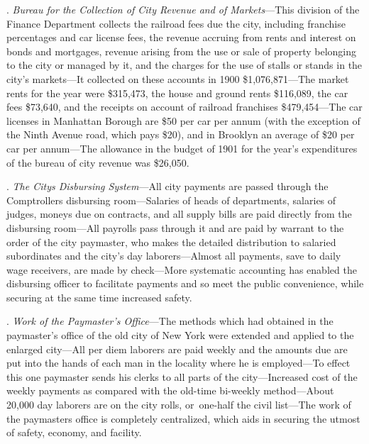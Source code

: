 \documentclass[twoside,symmetric,nobib,justified]{tufte-book}
\begin{document}
. \emph{Bureau for the Collection of City Revenue and of
Markets}---This division of the Finance Department collects the railroad
fees due the city, including franchise percentages and car license fees,
the revenue accruing from rents and interest on bonds and mortgages,
revenue arising from the use or sale of property belonging to the city
or managed by it, and the charges for the use of stalls or stands in the
city's markets---It collected on these accounts in 1900
\$1,076,871---The market rents for the year were \$315,473, the house
and ground rents \$116,089, the car fees \$73,640, and the receipts on
account of railroad franchises \$479,454---The car licenses in Manhattan
Borough are \$50 per car per annum (with the exception of the Ninth
Avenue road, which pays \$20), and in Brooklyn an average of \$20 per
car per annum---The allowance in the budget of 1901 for the year's
expenditures of the bureau of city revenue was \$26,050.~

\vspace{.15in}

.\emph{ The City\textquotesingle s Disbursing System}---All city
payments are passed through the Comptroller\textquotesingle s disbursing
room---Salaries of heads of departments, salaries of judges, moneys due
on contracts, and all supply bills are paid directly from the disbursing
room---All payrolls pass through it and are paid by warrant to the order
of the city paymaster, who makes the detailed distribution to salaried
subordinates and the city's day laborers---Almost all payments, save to
daily wage receivers, are made by check---More systematic accounting has
enabled the disbursing officer to facilitate payments and so meet the
public convenience, while securing at the same time increased safety.~

\vspace{.15in}

. \emph{Work of the Paymaster's Office}---The methods which had
obtained in the paymaster's office of the old city of New York were
extended and applied to the enlarged city---All per diem laborers are
paid weekly and the amounts due are put into the hands of each man in
the locality where he is employed---To effect this one paymaster sends
his clerks to all parts of the city---Increased cost of the weekly
payments as compared with the old-time bi-weekly method---About 20,000
day laborers are on the city rolls, or~one-half the civil list---The
work of the paymaster\textquotesingle s office is completely
centralized, which aids in securing the utmost of safety, economy, and
facility.~
\end{document}
